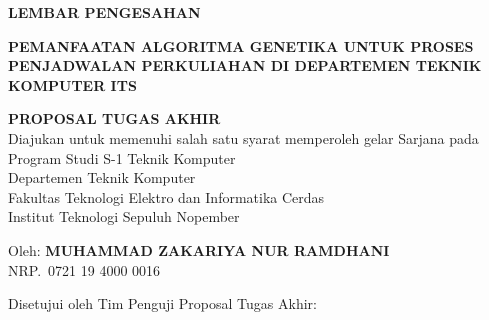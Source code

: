 \begin{center}
	\large
  \textbf{LEMBAR PENGESAHAN}
\end{center}

\thispagestyle{empty}

\begin{center}
  \textbf{PEMANFAATAN ALGORITMA GENETIKA UNTUK PROSES PENJADWALAN PERKULIAHAN DI DEPARTEMEN TEKNIK KOMPUTER ITS}
\end{center}

\begingroup
  \small

  \begin{center}
    \textbf{PROPOSAL TUGAS AKHIR} \\
    Diajukan untuk memenuhi salah satu syarat memperoleh gelar Sarjana pada \\
    Program Studi S-1 Teknik Komputer\\
    Departemen Teknik Komputer \\
    Fakultas Teknologi Elektro dan Informatika Cerdas \\
    Institut Teknologi Sepuluh Nopember
  \end{center}

  \begin{center}
    Oleh: \textbf{MUHAMMAD ZAKARIYA NUR RAMDHANI} \\
    NRP.\ 0721 19 4000 0016
  \end{center}

  \begin{center}
    Disetujui oleh Tim Penguji Proposal Tugas Akhir:
  \end{center}

  \begingroup
    \setlength{\tabcolsep}{0pt}

